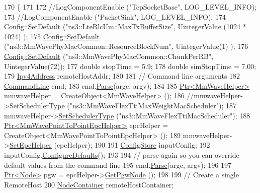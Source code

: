 \begin{DoxyCode}
170 \{
171 
172         \textcolor{comment}{//LogComponentEnable ("TcpSocketBase", LOG\_LEVEL\_INFO);}
173         \textcolor{comment}{//LogComponentEnable ("PacketSink", LOG\_LEVEL\_INFO);}
174         \hyperlink{group__config_ga2e7882df849d8ba4aaad31c934c40c06}{Config::SetDefault} (\textcolor{stringliteral}{"ns3::LteRlcUm::MaxTxBufferSize"}, UintegerValue (1024 * 1024)
      );
175         \hyperlink{group__config_ga2e7882df849d8ba4aaad31c934c40c06}{Config::SetDefault} (\textcolor{stringliteral}{"ns3::MmWavePhyMacCommon::ResourceBlockNum"}, UintegerValue(1)
      );
176         \hyperlink{group__config_ga2e7882df849d8ba4aaad31c934c40c06}{Config::SetDefault} (\textcolor{stringliteral}{"ns3::MmWavePhyMacCommon::ChunkPerRB"}, UintegerValue(72));
177         \textcolor{keywordtype}{double} stopTime = 5.9;
178         \textcolor{keywordtype}{double} simStopTime = 7.00;
179         \hyperlink{classns3_1_1Ipv4Address}{Ipv4Address} remoteHostAddr;
180 
181         \textcolor{comment}{// Command line arguments}
182         \hyperlink{classns3_1_1CommandLine}{CommandLine} cmd;
183         cmd.\hyperlink{classns3_1_1CommandLine_a5c10b85b3207e5ecb48d907966923156}{Parse}(argc, argv);
184 
185         \hyperlink{classns3_1_1Ptr}{Ptr<MmWaveHelper>} mmwaveHelper = CreateObject<MmWaveHelper> ();
186         \textcolor{comment}{//mmwaveHelper->SetSchedulerType ("ns3::MmWaveFlexTtiMaxWeightMacScheduler");}
187         mmwaveHelper->\hyperlink{classns3_1_1MmWaveHelper_ae38f5e96d749ab63dda7746f43dfbe84}{SetSchedulerType} (\textcolor{stringliteral}{"ns3::MmWaveFlexTtiMacScheduler"});
188         \hyperlink{classns3_1_1Ptr}{Ptr<MmWavePointToPointEpcHelper>}  epcHelper = 
      CreateObject<MmWavePointToPointEpcHelper> ();
189         mmwaveHelper->\hyperlink{classns3_1_1MmWaveHelper_a54fc98a649a710153b479d0878558733}{SetEpcHelper} (epcHelper);
190 
191         \hyperlink{classns3_1_1ConfigStore}{ConfigStore} inputConfig;
192         inputConfig.\hyperlink{classns3_1_1ConfigStore_a0a6137574d7c847c3823af8b9d1bb886}{ConfigureDefaults}();
193 
194         \textcolor{comment}{// parse again so you can override default values from the command line}
195         cmd.\hyperlink{classns3_1_1CommandLine_a5c10b85b3207e5ecb48d907966923156}{Parse}(argc, argv);
196 
197         \hyperlink{classns3_1_1Ptr}{Ptr<Node>} pgw = epcHelper->\hyperlink{classns3_1_1MmWavePointToPointEpcHelper_a586f072ee5b09376531ba605b3fed05f}{GetPgwNode} ();
198 
199         \textcolor{comment}{// Create a single RemoteHost}
200         \hyperlink{classns3_1_1NodeContainer}{NodeContainer} remoteHostContainer;

\end{DoxyCode}
